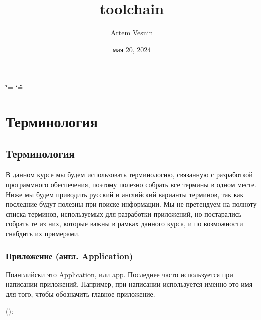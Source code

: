 \documentclass[letterpaper,10pt,russian]{sphinxmanual}
\title{toolchain}
\date{мая 20, 2024}
\author{Artem Vesnin}
\begin{document}
\ifdefined\shorthandoff
  \ifnum\catcode`\=\string=\active\shorthandoff{=}\fi
  \ifnum\catcode`\"=\active{}\fi
\fi

\pagestyle{empty}
\sphinxmaketitle
\pagestyle{plain}
\sphinxtableofcontents
\pagestyle{normal}
\label{\detokenize{index::doc}}



\chapter{Терминология}
\label{\detokenize{index:id2}}
\sphinxstepscope


\section{Терминология}
\label{\detokenize{educational_materials/terms/content:id1}}\label{\detokenize{educational_materials/terms/content::doc}}
\sphinxAtStartPar
В данном курсе мы будем использовать терминологию, связанную с разработкой программного обеспечения, поэтому полезно собрать все термины в одном месте. Ниже мы будем приводить русский и английский варианты терминов, так как последние будут полезны при поиске информации. Мы не претендуем на полноту списка терминов, используемых для разработки приложений, но постарались собрать те из них, которые важны в рамках данного курса, и по возможности снабдить их примерами.


\subsection{Приложение (англ. Application)}
\label{\detokenize{educational_materials/terms/content:application}}
\sphinxAtStartPar
По\sphinxhyphen{}английски это Application, или app. Последнее часто используется при написании приложений. Например, при написании  используется именно это имя для того, чтобы обозначить главное приложение.

\sphinxAtStartPar
():

\begin{sphinxVerbatim}[commandchars=\\\{\}]
   

  

  
      
\end{sphinxVerbatim}
\end{document}
